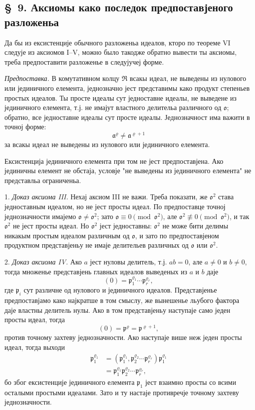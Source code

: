 \documentclass[11pt]{article}
\providecommand{\mR}{\mathfrak{R}}
\providecommand{\ma}{\mathfrak{a}}
\providecommand{\mo}{\mathfrak{o}}
\providecommand{\mpideal}{\mathfrak{p}}
\begin{document}
\setcounter{footnote}{31}

\subsection*{\S~9. Аксиомы како последок предпоставјеного разложеньа}

Да бы из ексистенције обычного разложеньа идеалов, кторо по теореме VI следује из аксиомов I--V, можно было такодже обратно вывести ты аксиомы, треба предпоставити разложенье в следујучеј форме.

\emph{Предпоставка.} В комутативном колцу $\mR$ всакы идеал, не выведены из нулового или јединичного елемента, једнозначно јест представимы како продукт степеньев простых идеалов. Ты просте идеалы сут једноставне идеалы, не выведене из јединичного елемента, т.ј. не имајут властного делительа различного од $\mo$; обратно, все једноставне идеалы сут просте идеалы. Једнозначност има важити в точној форме:
\[
        \ma^\varrho\ne\ma^{\varrho+1}
\]
за всакы идеал не выведены из нулового или јединичного елемента.

Ексистенција јединичного елемента при том не јест предпоставјена. Ако јединичны елемент не обстаја, условје "не выведены из јединичного елемента" не представльа ограниченьа.

1. \emph{Доказ аксиома III.} Нехај аксиом III не важи. Треба показати, же $\mo^2$ става једноставным идеалом, но не јест просты идеал. По предпоставце точној једнозначности имајемо $\mo\ne\mo^2$; зато $\mo\equiv0\pmod{\mo^2}$, але $\mo^2\not\equiv0\pmod{\mo^2}$, и так $\mo^2$ не јест просты идеал. Но $\mo^2$ јест једноставны: $\mo^2$ не може бити делимы никакым простым идеалом различным од $\mo$, и зато по предпоставјеном продуктном представјеньу не имаје делительев различных од $\mo$ или $\mo^2$.

2. \emph{Доказ аксиома IV.} Ако $a$ јест нуловы делитель, т.ј. $ab=0$, але $a\ne0$ и $b\ne0$, тогда множенье представјень главных идеалов выведеных из $a$ и $b$ даје
\[
        (0)=\mpideal_1^{\varrho_1}\cdots\mpideal_r^{\varrho_r},
\]
где $\mpideal_i$ сут различне од нулового и јединичного идеалов. Представјенье предпоставјамо како најкратше в том смыслу, же вынешенье льубого фактора даје властны делитель нулы. Ако в том представјеньу наступаје само једен просты идеал, тогда
\[
        (0)=\mpideal^\varrho=\mpideal^{\varrho+1},
\]
против точному захтеву једнозначности. Ако наступаје више неж једен просты идеал, тогда выходи
\[
\begin{aligned}
\mpideal_1^{\varrho_1}
 &= (\mpideal_1^{\varrho_1},\mpideal_2^{\varrho_2}\cdots\mpideal_r^{\varrho_r})\mpideal_1^{\varrho_1}  \\
 &= \mpideal_1^{\varrho_1}\mpideal_2^{\varrho_2}\cdots\mpideal_r^{\varrho_r},
\end{aligned}
\]
бо због ексистенције јединичного елемента $\mpideal_1$ јест взаимно просты со всими осталыми простыми идеалами. Зато и ту настаје противречје точному захтеву једнозначности.
\end{document}
